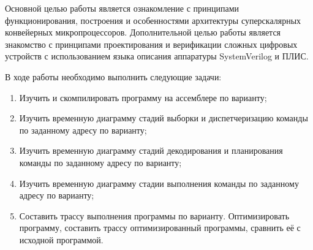 
Основной целью работы является ознакомление с принципами функционирования,
построения и особенностями архитектуры суперскалярных конвейерных микропроцессоров.
Дополнительной целью работы является знакомство с принципами проектирования и
верификации сложных цифровых устройств с использованием языка описания аппаратуры
SystemVerilog и ПЛИС.

В ходе работы необходимо выполнить следующие задачи:
\begin{enumerate}
	\item Изучить и скомпилировать программу на ассемблере по варианту;
	\item Изучить временную диаграмму стадий выборки и диспетчеризацию команды по заданному адресу по варианту;
	\item Изучить временную диаграмму стадий декодирования и планирования команды по заданному адресу по варианту;
	\item Изучить временную диаграмму стадии выполнения команды по заданному адресу по варианту;
	\item Составить трассу выполнения программы по варианту. Оптимизировать программу, составить трассу оптимизированный программы, сравнить её с исходной программой.
\end{enumerate}
\clearpage

